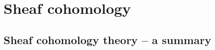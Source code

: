 

\section{Sheaf cohomology}


\renewcommand{\theenumi}{\roman{enumi}}
\renewcommand{\labelenumi}{\textnormal{(\theenumi)}$\;\;$}


\subsection{Sheaf cohomology theory -- a summary}
\setcounter{theorem}{0}
\setcounter{equation}{0}

